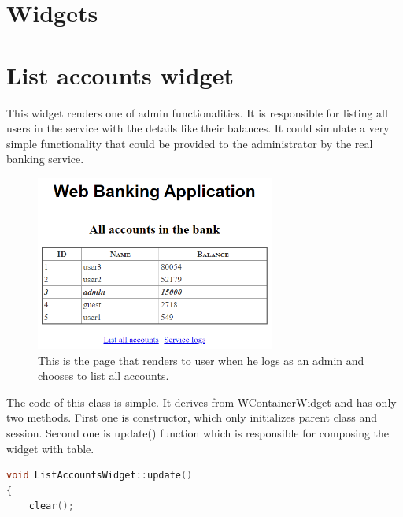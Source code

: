 \documentclass[a4paper,12pt]{book}
\newcommand\tab[1][1cm]{\hspace*{#1}}
\begin{document}
\section{Widgets}
{
\section*{List accounts widget}
{

\tab This widget renders one of admin functionalities. It is responsible for listing all users in the service with the details like their balances. It could simulate a very simple functionality that could be provided to the administrator by the real banking service. 

\begin{figure}[H]
\centering
\includegraphics[width=0.7\textwidth]{listaccounts}
\caption{This is the page that renders to user when he logs as an admin and chooses to list all accounts.}
\end{figure}  

The code of this class is simple. It derives from WContainerWidget and has only two methods. First one is constructor, which only initializes parent class and session. Second one is update() function which is responsible for composing the widget with table.

\bigskip
\begin{lstlisting}[frame=single, basicstyle=\small, language=C++, caption={ListAccountsWidget::update() function. Assuming that you use a compiler with C++14 support you can use std::make unique instead of Wt::cpp14::make unique. In the application std::make unique was used because it allows us to have a better control of the lifetime of the widget. For instance if we want to, we can retrieve a std::unique ptr with  WObject::removeChild() function, which ultimately will unplug a single widget. The disadvantage of using this smart pointer is the fact that we are dealing with a raw pointer and as always it's ownership must be changed carefully, otherwise it might cause a memory leak.}, captionpos=b]
void ListAccountsWidget::update()
{
    clear();


\end{lstlisting}}}
\end{document}
